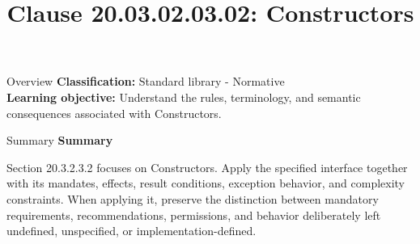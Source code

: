 \documentclass[10pt,letterpaper]{article}
\title{Clause 20.03.02.03.02: Constructors}
\author{}
\date{}
\begin{document}
\maketitle
\begin{CornellOverviewBox}{Overview}
\textbf{Classification:} Standard library - Normative\\[2pt]
\textbf{Learning objective:} Understand the rules, terminology, and semantic consequences associated with Constructors.
\end{CornellOverviewBox}\begin{CornellSummaryBox}{Summary}
{\sffamily\bfseries\color{Accent} Summary}\par\vspace{3pt}Section 20.3.2.3.2 focuses on Constructors. Apply the specified interface together with its mandates, effects, result conditions, exception behavior, and complexity constraints. When applying it, preserve the distinction between mandatory requirements, recommendations, permissions, and behavior deliberately left undefined, unspecified, or implementation-defined.
\end{CornellSummaryBox}
\end{document}
